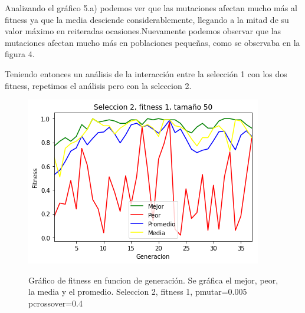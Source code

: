 \documentclass[A4paper,oneside,fleqn,11pt]{article}
\theoremstyle{definition}
\begin{document}
Analizando el gráfico 5.a) podemos ver que las mutaciones afectan mucho más al fitness ya que la media desciende considerablemente, llegando a la mitad de su valor máximo en reiteradas ocasiones.Nuevamente podemos observar que las mutaciones afectan mucho más en poblaciones pequeñas, como se observaba en la figura 4.

Teniendo entonces un análisis de la interacción entre la selección 1 con los dos fitness, repetimos el análisis pero con la seleccion 2.



\begin{figure}[H]
	\captionsetup[subfigure]{position=b}
	\centering
		{\includegraphics[width=0.3\linewidth]{s2f1t50.png}}
	\caption{Gráfico de fitness en funcion de generación. Se gráfica el mejor, peor, la media y el promedio. Seleccion 2, fitness 1, pmutar=0.005 pcrossover=0.4}
\end{figure}
\end{document}
